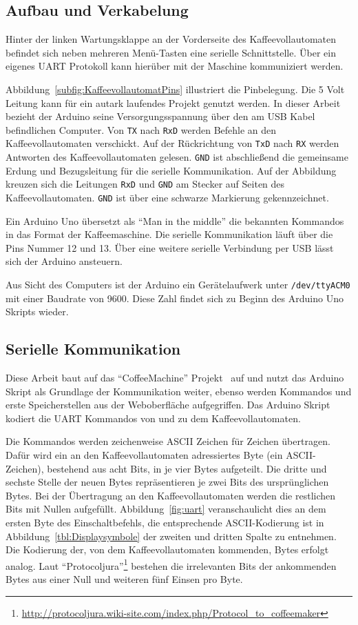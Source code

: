 \subsection{Aufbau und Verkabelung}\label{subsec:AufbauUndVerkabelung}
Hinter der linken Wartungsklappe an der Vorderseite des Kaffeevollautomaten befindet sich neben mehreren Menü-Tasten eine serielle Schnittstelle.
Über ein eigenes \ac{UART} Protokoll kann hierüber mit der Maschine kommuniziert werden.

Abbildung~\ref{subfig:KaffeevollautomatPins} illustriert die Pinbelegung.
Die 5 Volt Leitung kann für ein autark laufendes Projekt genutzt werden.
In dieser Arbeit bezieht der Arduino seine Versorgungsspannung über den am USB Kabel befindlichen Computer.
Von \texttt{TX} nach \texttt{RxD} werden Befehle an den Kaffeevollautomaten verschickt.
Auf der Rückrichtung von \texttt{TxD} nach \texttt{RX} werden Antworten des Kaffeevollautomaten gelesen.
\texttt{GND} ist abschließend die gemeinsame Erdung und Bezugsleitung für die serielle Kommunikation.
Auf der Abbildung kreuzen sich die Leitungen \texttt{RxD} und \texttt{GND} am Stecker auf Seiten des Kaffeevollautomaten.
\texttt{GND} ist über eine schwarze Markierung gekennzeichnet.

Ein Arduino Uno übersetzt als "`Man in the middle"' die bekannten Kommandos in das Format der Kaffeemaschine.
Die serielle Kommunikation läuft über die Pins Nummer 12 und 13.
Über eine weitere serielle Verbindung per USB lässt sich der Arduino ansteuern.

Aus Sicht des Computers ist der Arduino ein Gerätelaufwerk unter \texttt{/dev/ttyACM0} mit einer Baudrate von 9600.
Diese Zahl findet sich zu Beginn des Arduino Uno Skripts wieder.

\subsection{Serielle Kommunikation}
Diese Arbeit baut auf das "`CoffeeMachine"' Projekt~\cite{GitCoffeeMachine} auf und nutzt das Arduino Skript als Grundlage der Kommunikation weiter, ebenso werden Kommandos und erste Speicherstellen aus der Weboberfläche aufgegriffen.
Das Arduino Skript kodiert die \ac{UART} Kommandos von und zu dem Kaffeevollautomaten.

Die Kommandos werden zeichenweise \ac{ASCII} Zeichen für Zeichen übertragen.
Dafür wird ein an den Kaffeevollautomaten adressiertes Byte (ein \ac{ASCII}-Zeichen), bestehend aus acht Bits, in je vier Bytes aufgeteilt.
Die dritte und sechste Stelle der neuen Bytes repräsentieren je zwei Bits des ursprünglichen Bytes.
Bei der Übertragung an den Kaffeevollautomaten werden die restlichen Bits mit Nullen aufgefüllt.
Abbildung~\ref{fig:uart} veranschaulicht dies an dem ersten Byte des Einschaltbefehls, die entsprechende \ac{ASCII}-Kodierung ist in Abbildung~\ref{tbl:Displaysymbole} der zweiten und dritten Spalte zu entnehmen.
Die Kodierung der, von dem Kaffeevollautomaten kommenden, Bytes erfolgt analog.
Laut "`Protocoljura"'\footnote{\url{http://protocoljura.wiki-site.com/index.php/Protocol_to_coffeemaker}} bestehen die irrelevanten Bits der ankommenden Bytes aus einer Null und weiteren fünf Einsen pro Byte.

